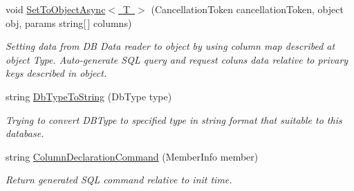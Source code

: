 \begin{DoxyCompactItemize}
void \mbox{\hyperlink{interface_uniform_data_operator_1_1_sql_1_1_i_sql_operator_ab2ab621174a956a67f9799469570dd11}{Set\+To\+Object\+Async$<$ T $>$}} (Cancellation\+Token cancellation\+Token, object obj, params string\mbox{[}$\,$\mbox{]} columns)
\begin{DoxyCompactList}\small\item\em Setting data from DB Data reader to object by using column map described at object Type. Auto-\/generate S\+QL query and request coluns data relative to privary keys described in object. \end{DoxyCompactList}\item 
string \mbox{\hyperlink{interface_uniform_data_operator_1_1_sql_1_1_i_sql_operator_a51af40df39808d53cdcc81852b836634}{Db\+Type\+To\+String}} (Db\+Type type)
\begin{DoxyCompactList}\small\item\em Trying to convert D\+B\+Type to specified type in string format that suitable to this database. \end{DoxyCompactList}\item 
string \mbox{\hyperlink{interface_uniform_data_operator_1_1_sql_1_1_i_sql_operator_aac9c3ed1e73af66e383340a154786ec7}{Column\+Declaration\+Command}} (Member\+Info member)
\begin{DoxyCompactList}\small\item\em Return generated S\+QL command relative to init time. \end{DoxyCompactList}\end{DoxyCompactItemize}
